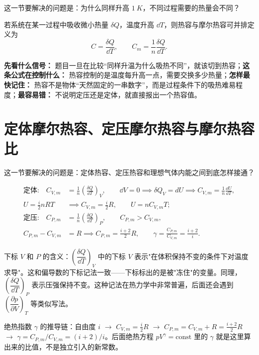 \documentclass[lang=cn,11pt]{elegantbook}
\newcommand{\bridge}[1]{\begin{note}#1\end{note}}
\begin{document}
这一节要解决的问题是：为什么同样升高 \(\SI{1}{K}\)，不同过程需要的热量会不同？

若系统在某一过程中吸收微小热量 \(\delta Q\)，温度升高 \(\dd T\)，则热容与摩尔热容可并排定义为
\[
C=\frac{\delta Q}{\dd T},\qquad
C_m=\frac{1}{n}\frac{\delta Q}{\dd T}.
\]

\begin{note}
\textbf{先看什么信号：} 题目一旦在比较“同样升温为什么吸热不同”，就该切到热容；\textbf{这条公式在控制什么：} 热容控制的是温度每升高一点，需要交换多少热量；\textbf{怎样最快记住：} 热容不是物体“天然固定的一串数字”，而是过程条件下的吸热难易程度；\textbf{最容易错：} 不说明定压还是定体，就直接报出一个热容值。
\end{note}

\section{定体摩尔热容、定压摩尔热容与摩尔热容比}

这一节要解决的问题是：定体热容、定压热容和理想气体内能之间到底怎样接通？

\begin{align*}
\text{定体:}\quad C_{V,m}&=\frac{1}{n}\left(\frac{\delta Q}{\dd T}\right)_V,\qquad
\dd V=0 \implies \delta Q_V=dU \implies C_{V,m}=\frac{1}{n}\frac{\dd U}{\dd T},\\
U=\frac{i}{2}nRT &\implies C_{V,m}=\frac{i}{2}R,\qquad U=nC_{V,m}T;\\
\text{定压:}\quad C_{P,m}&=\frac{1}{n}\left(\frac{\delta Q}{\dd T}\right)_P,\qquad C_{P,m}>C_{V,m},\\
C_{P,m}-C_{V,m}&=R \implies C_{P,m}=\frac{i+2}{2}R,\qquad \gamma=\frac{C_{P,m}}{C_{V,m}}=\frac{i+2}{i}.
\end{align*}

\begin{remark}
下标 \(V\) 和 \(P\) 的含义：\(\left(\dfrac{\delta Q}{\dd T}\right)_V\) 中的下标 \(V\) 表示"在体积保持不变的条件下对温度求导"。这和偏导数的下标记法一致——下标标出的是被"冻住"的变量。同理，\(\left(\dfrac{\delta Q}{\dd T}\right)_P\) 表示压强保持不变。这种记法在热力学中非常普遍，后面还会遇到 \(\left(\dfrac{\partial p}{\partial V}\right)_T\) 等类似写法。
\end{remark}

\bridge{绝热指数 \(\gamma\) 的推导链：自由度 \(i\) \(\to\) \(C_{V,m}=\frac{i}{2}R\) \(\to\) \(C_{P,m}=C_{V,m}+R=\frac{i+2}{2}R\) \(\to\) \(\gamma=C_{P,m}/C_{V,m}=(i+2)/i\)。后面绝热方程 \(pV^\gamma=\text{const}\) 里的 \(\gamma\) 就是这里算出来的比值，不是独立引入的新常数。}
\end{document}
